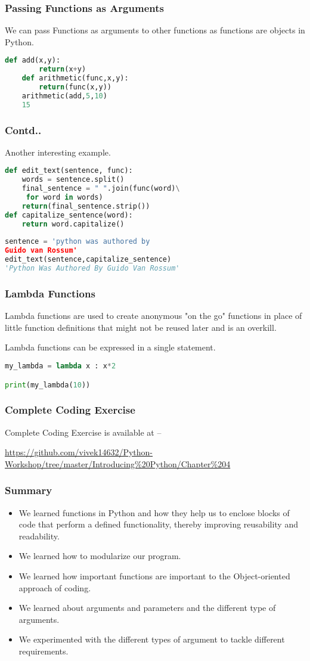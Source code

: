 \documentclass{beamer}
\begin{document}
\begin{frame}[fragile]
\frametitle{Passing Functions as Arguments}
We can pass Functions as arguments to other functions as functions are objects in Python.
\begin{lstlisting}[language=Python]
	def add(x,y):
		return(x+y)
	def arithmetic(func,x,y):
		return(func(x,y))
	arithmetic(add,5,10)
	15
\end{lstlisting}
\end{frame}

\begin{frame}[fragile]
\frametitle{Contd..}
Another interesting example.
\begin{lstlisting}[language=Python]
def edit_text(sentence, func):
    words = sentence.split()
    final_sentence = " ".join(func(word)\
     for word in words)
    return(final_sentence.strip())  
def capitalize_sentence(word):
    return word.capitalize()
    
sentence = 'python was authored by 
Guido van Rossum'
edit_text(sentence,capitalize_sentence)
'Python Was Authored By Guido Van Rossum'
\end{lstlisting}
\end{frame}

\begin{frame}[fragile]
\frametitle{Lambda Functions}
Lambda functions are used to create anonymous "on the go" functions in place of little function definitions that might not be reused later and is an overkill.

Lambda functions can be expressed in a single statement.
\begin{lstlisting}[language=Python]
my_lambda = lambda x : x*2

print(my_lambda(10))

\end{lstlisting}
\end{frame}

\begin{frame}
\frametitle{Complete Coding Exercise}
Complete Coding Exercise is available at --
 
\url{https://github.com/vivek14632/Python-Workshop/tree/master/Introducing\%20Python/Chapter\%204}
\end{frame}


\begin{frame}
\frametitle{Summary}
\begin{itemize}
\item We learned functions  in Python and how they help us to enclose blocks of code that perform a defined functionality, thereby improving reusability and readability.
\item We learned how to modularize our program.
\item We learned how important functions are important to the Object-oriented approach of coding.
\item We learned about arguments and parameters and the different type of arguments.
\item We experimented with the different types of argument to tackle different requirements.
\end{itemize}
\end{frame}
\end{document}
